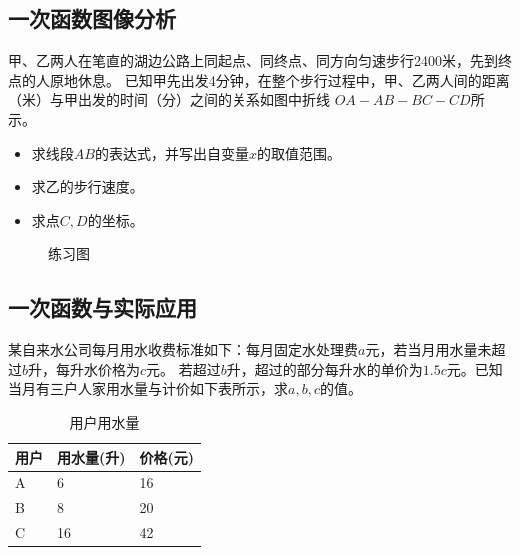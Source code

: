 \begin{figure}[H]
    \centering
    \resizebox{4cm}{!}{}
\end{figure}

\subsection{一次函数图像分析}

\begin{example}
    甲、乙两人在笔直的湖边公路上同起点、同终点、同方向匀速步行2400米，先到终点的人原地休息。
    已知甲先出发4分钟，在整个步行过程中，甲、乙两人间的距离（米）与甲出发的时间（分）之间的关系如图中折线
    $OA-AB-BC-CD$所示。
    \begin{itemize}
        \item 求线段$AB$的表达式，并写出自变量$x$的取值范围。
        \item 求乙的步行速度。
        \item 求点$C,D$的坐标。
    \end{itemize}
\end{example}

\begin{figure}[H]
    \centering
    \resizebox{6cm}{!}{}
    \caption{练习图}
\end{figure}

\subsection{一次函数与实际应用}

\begin{example}
    某自来水公司每月用水收费标准如下：每月固定水处理费$a$元，若当月用水量未超过$b$升，每升水价格为$c$元。
    若超过$b$升，超过的部分每升水的单价为$1.5c$元。已知当月有三户人家用水量与计价如下表所示，求$a,b,c$的值。
\end{example}
\begin{table}[ht]
    \centering
    \caption{用户用水量}
    \begin{tabular}{|l|l|l|}
        \hline
        用户 & 用水量(升) & 价格(元) \\
        \hline
        A  & 6      & 16    \\
        \hline
        B  & 8      & 20    \\
        \hline
        C  & 16     & 42    \\
        \hline
    \end{tabular}
\end{table}

